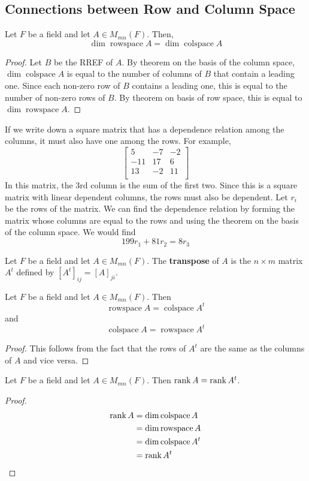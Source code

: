 \documentclass{article}
\DeclareMathOperator{\colspace}{colspace}
\DeclareMathOperator{\rowspace}{rowspace}
\begin{document}
\subsection{Connections between Row and Column Space}
\begin{theorem}
  Let $F$ be a field and let $A \in M_{mn}(F)$. Then, \[
    \dim \rowspace A = \dim \colspace A
  \]
\end{theorem}
\begin{proof}
  Let $B$ be the RREF of $A$. By theorem on the basis of the column space, $\dim \colspace A$ is equal to the number of columns of $B$ that contain a leading one. Since each non-zero row of $B$ contains a leading one, this is equal to the number of non-zero rows of $B$. By theorem on basis of row space, this is equal to $\dim \rowspace A$.
\end{proof}
\begin{example}
  If we write down a square matrix that has a dependence relation among the columns, it must also have one among the rows. For example,
  \[
    \begin{bmatrix}
      5 & -7 & -2\\
      -11 & 17 & 6\\
      13 & -2 & 11\\
    \end{bmatrix}
  \]
  In this matrix, the 3rd column is the sum of the first two. Since this is a square matrix with linear dependent columns, the rows must also be dependent. Let $r_i$ be the rows of the matrix. We can find the dependence relation by forming the matrix whose columns are equal to the rows and using the theorem on the basis of the column space. We would find
  \[
    199r_1 + 81r_2 = 8r_3
  \]
\end{example}
\begin{definition}
  Let $F$ be a field and let $A \in M_{mn}(F)$. The \textbf{transpose} of $A$ is the $n \times m$ matrix $A^t$ defined by $[A^t]_{ij} = [A]_{ji}$.
\end{definition}
\begin{theorem}
  Let $F$ be a field and let $A \in M_{mn}(F)$. Then
  \[
    \rowspace A = \colspace A^t
  \] and \[
    \colspace A = \rowspace A^t
  \]
\end{theorem}
\begin{proof}
  This follows from the fact that the rows of $A^t$ are the same as the columns of $A$ and vice versa.
\end{proof}
\begin{theorem}
  Let $F$ be a field and let $A \in M_{mn}(F)$. Then $\rank A = \rank A^t$.
\end{theorem}
\begin{proof}
  \begin{align*}
    \rank A &= \dim \colspace A\\
    &= \dim \rowspace A\\
    &= \dim \colspace A^t\\
    &= \rank A^t
  \end{align*}
\end{proof}
\end{document}

